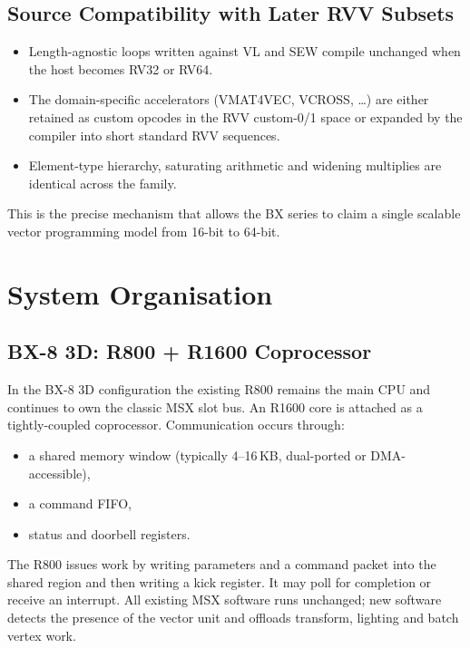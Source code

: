\documentclass[11pt,a4paper]{article}
\begin{document}
\subsection{Source Compatibility with Later RVV Subsets}

\begin{itemize}[leftmargin=1.5em]
  \item Length-agnostic loops written against VL and SEW compile unchanged when the host becomes RV32 or RV64.
  \item The domain-specific accelerators (VMAT4VEC, VCROSS, \ldots) are either retained as custom opcodes in the RVV custom-0/1 space or expanded by the compiler into short standard RVV sequences.
  \item Element-type hierarchy, saturating arithmetic and widening multiplies are identical across the family.
\end{itemize}

This is the precise mechanism that allows the BX series to claim a single scalable vector programming model from 16-bit to 64-bit.

\section{System Organisation}

\subsection{BX-8 3D: R800 + R1600 Coprocessor}

In the BX-8 3D configuration the existing R800 remains the main CPU and continues to own the classic MSX slot bus. An R1600 core is attached as a tightly-coupled coprocessor. Communication occurs through:

\begin{itemize}
    \item a shared memory window (typically 4--16\,KB, dual-ported or DMA-accessible),
    \item a command FIFO,
    \item status and doorbell registers.
\end{itemize}

The R800 issues work by writing parameters and a command packet into the shared region and then writing a kick register. It may poll for completion or receive an interrupt. All existing MSX software runs unchanged; new software detects the presence of the vector unit and offloads transform, lighting and batch vertex work.
\end{document}
